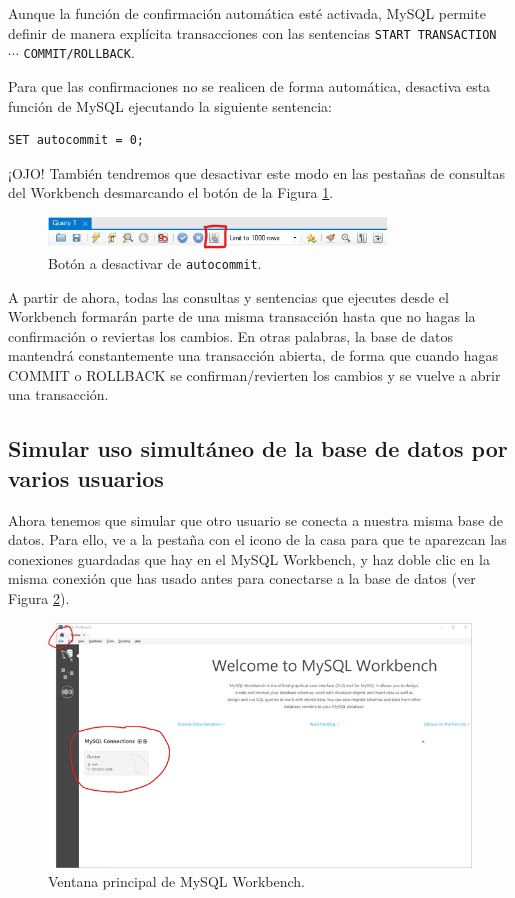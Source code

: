 \documentclass[a4paper]{article}
\begin{document}
Aunque la función de confirmación automática esté activada, MySQL permite definir de manera explícita transacciones con las sentencias \texttt{START TRANSACTION} $\cdots$ \texttt{COMMIT/ROLLBACK}.

Para que las confirmaciones no se realicen de forma automática, desactiva esta función de MySQL ejecutando la siguiente sentencia:

\begin{verbatim}
SET autocommit = 0;
\end{verbatim}

¡OJO! También tendremos que desactivar este modo en las pestañas de consultas del Workbench desmarcando el botón de la Figura \ref{fig:autoejecución}.

\begin{figure}[ht]
    \centering
    \includegraphics[width=0.8\textwidth]{figs/autoejecucion.png}
    \caption{Botón a desactivar de \texttt{autocommit}.}\label{fig:autoejecución}
\end{figure}

A partir de ahora, todas las consultas y sentencias que ejecutes desde el Workbench formarán parte de una misma transacción hasta que no hagas la confirmación o reviertas los cambios. En otras palabras, la base de datos mantendrá constantemente una transacción abierta, de forma que cuando hagas COMMIT o ROLLBACK se confirman/revierten los cambios y se vuelve a abrir una transacción.

\subsection*{Simular uso simultáneo de la base de datos por varios usuarios}

Ahora tenemos que simular que otro usuario se conecta a nuestra misma base de datos. Para ello, ve a la pestaña con el icono de la casa para que te aparezcan las conexiones guardadas que hay en el MySQL Workbench, y haz doble clic en la misma conexión que has usado antes para conectarse a la base de datos (ver Figura \ref{fig:mysqlwork}).

\begin{figure}[ht]
    \centering
    \includegraphics[width=0.9\columnwidth]{figs/mysqlwork.png}
    \caption{Ventana principal de MySQL Workbench.}\label{fig:mysqlwork}
\end{figure}
\end{document}
